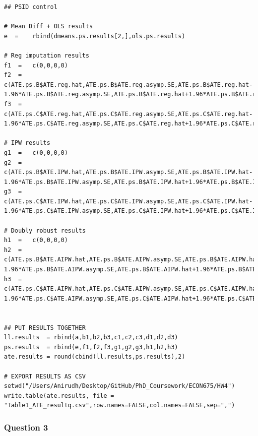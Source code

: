 \documentclass[12pt]{article}
\begin{document}
\begin{verbatim}
## PSID control

# Mean Diff + OLS results
e  =    rbind(dmeans.ps.results[2,],ols.ps.results)

# Reg imputation results
f1  =   c(0,0,0,0)
f2  =   c(ATE.ps.B$ATE.reg.hat,ATE.ps.B$ATE.reg.asymp.SE,ATE.ps.B$ATE.reg.hat-1.96*ATE.ps.B$ATE.reg.asymp.SE,ATE.ps.B$ATE.reg.hat+1.96*ATE.ps.B$ATE.reg.asymp.SE)
f3  =   c(ATE.ps.C$ATE.reg.hat,ATE.ps.C$ATE.reg.asymp.SE,ATE.ps.C$ATE.reg.hat-1.96*ATE.ps.C$ATE.reg.asymp.SE,ATE.ps.C$ATE.reg.hat+1.96*ATE.ps.C$ATE.reg.asymp.SE)

# IPW results
g1  =   c(0,0,0,0)
g2  =   c(ATE.ps.B$ATE.IPW.hat,ATE.ps.B$ATE.IPW.asymp.SE,ATE.ps.B$ATE.IPW.hat-1.96*ATE.ps.B$ATE.IPW.asymp.SE,ATE.ps.B$ATE.IPW.hat+1.96*ATE.ps.B$ATE.IPW.asymp.SE)
g3  =   c(ATE.ps.C$ATE.IPW.hat,ATE.ps.C$ATE.IPW.asymp.SE,ATE.ps.C$ATE.IPW.hat-1.96*ATE.ps.C$ATE.IPW.asymp.SE,ATE.ps.C$ATE.IPW.hat+1.96*ATE.ps.C$ATE.IPW.asymp.SE)

# Doubly robust results
h1  =   c(0,0,0,0)
h2  =   c(ATE.ps.B$ATE.AIPW.hat,ATE.ps.B$ATE.AIPW.asymp.SE,ATE.ps.B$ATE.AIPW.hat-1.96*ATE.ps.B$ATE.AIPW.asymp.SE,ATE.ps.B$ATE.AIPW.hat+1.96*ATE.ps.B$ATE.AIPW.asymp.SE)
h3  =   c(ATE.ps.C$ATE.AIPW.hat,ATE.ps.C$ATE.AIPW.asymp.SE,ATE.ps.C$ATE.AIPW.hat-1.96*ATE.ps.C$ATE.AIPW.asymp.SE,ATE.ps.C$ATE.AIPW.hat+1.96*ATE.ps.C$ATE.AIPW.asymp.SE)


## PUT RESULTS TOGETHER
ll.results  = rbind(a,b1,b2,b3,c1,c2,c3,d1,d2,d3)
ps.results  = rbind(e,f1,f2,f3,g1,g2,g3,h1,h2,h3)
ate.results = round(cbind(ll.results,ps.results),2)

# EXPORT RESULTS AS CSV
setwd("/Users/Anirudh/Desktop/GitHub/PhD_Coursework/ECON675/HW4")
write.table(ate.results, file = "Table1_ATE_resultq.csv",row.names=FALSE,col.names=FALSE,sep=",")
\end{verbatim}


\subsubsection{Question 3}
\end{document}
